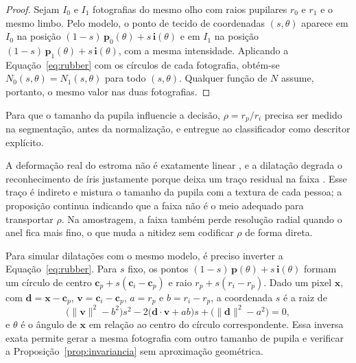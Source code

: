 \begin{proof}
Sejam $I_0$ e $I_1$ fotografias do mesmo olho com raios pupilares $r_0$ e
$r_1$ e o mesmo limbo. Pelo modelo, o ponto de tecido de coordenadas
$(s,\theta)$ aparece em $I_0$ na posição
$(1-s)\,\mathbf{p}_0(\theta)+s\,\mathbf{i}(\theta)$ e em $I_1$ na posição
$(1-s)\,\mathbf{p}_1(\theta)+s\,\mathbf{i}(\theta)$, com a mesma intensidade.
Aplicando a Equação~\eqref{eq:rubber} com os círculos de cada fotografia,
obtém-se $N_0(s,\theta)=N_1(s,\theta)$ para todo $(s,\theta)$. Qualquer função
de $N$ assume, portanto, o mesmo valor nas duas fotografias.
\end{proof}

\begin{corolario}\label{cor:explicito}
Para que o tamanho da pupila influencie a decisão, $\rho=r_p/r_i$ precisa ser
medido na segmentação, antes da normalização, e entregue ao classificador
como descritor explícito.
\end{corolario}

A deformação real do estroma não é exatamente linear
\citep*{Wyatt2000,TomeoReyes2015}, e a dilatação degrada o reconhecimento de
íris justamente porque deixa um traço residual na faixa
\citep*{Hollingsworth2009}. Esse traço é indireto e mistura o tamanho da
pupila com a textura de cada pessoa; a proposição continua indicando que a
faixa não é o meio adequado para transportar $\rho$. Na amostragem, a faixa
também perde resolução radial quando o anel fica mais fino, o que muda a
nitidez sem codificar $\rho$ de forma direta.

Para simular dilatações com o mesmo modelo, é preciso inverter a
Equação~\eqref{eq:rubber}. Para $s$ fixo, os pontos
$(1-s)\,\mathbf{p}(\theta)+s\,\mathbf{i}(\theta)$ formam um círculo de
centro $\mathbf{c}_p+s(\mathbf{c}_i-\mathbf{c}_p)$ e raio $r_p+s(r_i-r_p)$.
Dado um pixel $\mathbf{x}$, com $\mathbf{d}=\mathbf{x}-\mathbf{c}_p$,
$\mathbf{v}=\mathbf{c}_i-\mathbf{c}_p$, $a=r_p$ e $b=r_i-r_p$, a coordenada
$s$ é a raiz de
\begin{equation}
  \big(\lVert\mathbf{v}\rVert^2-b^2\big)s^2
  -2\big(\mathbf{d}\cdot\mathbf{v}+ab\big)s
  +\big(\lVert\mathbf{d}\rVert^2-a^2\big)=0,
  \label{eq:inversa}
\end{equation}
e $\theta$ é o ângulo de $\mathbf{x}$ em relação ao centro do círculo
correspondente. Essa inversa exata permite gerar a mesma fotografia com
outro tamanho de pupila e verificar a Proposição~\ref{prop:invariancia} sem
aproximação geométrica.

\label{sec:geometria}

